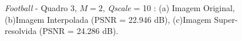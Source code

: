 \begin{figure}[h]
    \centering
    \qquad
	

    \caption{\textit{Football} - Quadro 3, $M = 2$, \textit{Qscale} = 10 : (a) Imagem Original, (b)Imagem Interpolada (PSNR = 22.946 dB), (c)Imagem Super-resolvida (PSNR = 24.286 dB).}
	    
    \label{fig:5}
\end{figure}

